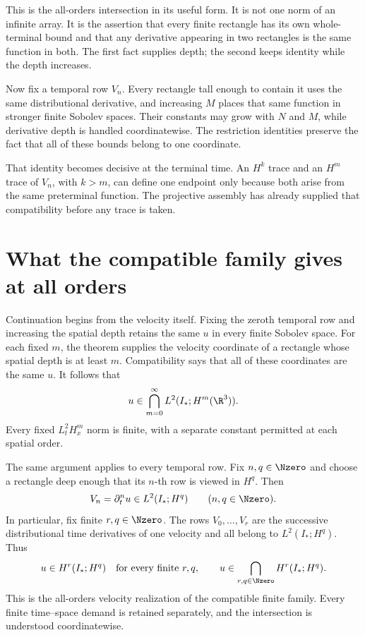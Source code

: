 This is the all-orders intersection in its useful form.  It is not one norm of
an infinite array.  It is the assertion that every finite rectangle has its
own whole-terminal bound and that any derivative appearing in two rectangles
is the same function in both.  The first fact supplies depth; the second keeps
identity while the depth increases.

Now fix a temporal row \(V_n\).  Every rectangle tall enough to contain it
uses the same distributional derivative, and increasing \(M\) places that
same function in stronger finite Sobolev spaces.  Their constants may grow
with \(N\) and \(M\), while derivative depth is handled coordinatewise.  The
restriction identities preserve the fact that all of these bounds belong to
one coordinate.

That identity becomes decisive at the terminal time.  An \(H^k\) trace and an
\(H^m\) trace of \(V_n\), with \(k>m\), can define one endpoint only because
both arise from the same preterminal function.  The projective assembly has
already supplied that compatibility before any trace is taken.

\section{What the compatible family gives at all orders}

Continuation begins from the velocity itself.  Fixing the zeroth temporal row
and increasing the spatial depth retains the same \(u\) in every finite
Sobolev space.  For each fixed \(m\), the theorem supplies the velocity
coordinate of a rectangle whose spatial depth is at least \(m\).
Compatibility says that all of these coordinates are the same \(u\).  It
follows that
\begin{equation*}
 u\in\bigcap_{m=0}^{\infty}L^2(I_*;H^m(\R^3)).
\end{equation*}
Every fixed \(L^2_tH^m_x\) norm is finite, with a separate constant permitted
at each spatial order.

The same argument applies to every temporal row.  Fix \(n,q\in\Nzero\) and
choose a rectangle deep enough that its \(n\)-th row is viewed in \(H^q\).
Then
\begin{equation*}
 V_n=\partial_t^n u\in L^2(I_*;H^q)
 \qquad(n,q\in\Nzero).
\end{equation*}
In particular, fix finite \(r,q\in\Nzero\).  The rows
\(V_0,\ldots,V_r\) are the successive distributional time derivatives of
one velocity and all belong to \(L^2(I_*;H^q)\).  Thus
\begin{equation*}
 u\in H^r(I_*;H^q)
 \quad\hbox{for every finite }r,q,
 \qquad
 u\in\bigcap_{r,q\in\Nzero}H^r(I_*;H^q).
\end{equation*}
This is the all-orders velocity realization of the compatible finite family.
Every finite time--space demand is retained separately, and the intersection
is understood coordinatewise.

